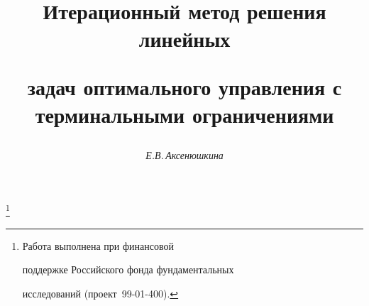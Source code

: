 




% 


\newcommand{\argmin}{\operatornamewithlimits{arg\,min}}


\newcommand{\tts}[1]{}







\setcounter{page}{3}















\author{\it Е.В.\,Аксенюшкина}




\title{Итерационный метод решения линейных 


задач оптимального управления с терминальными ограничениями}


\thanks{Работа выполнена при финансовой


поддержке Российского фонда фундаментальных


исследований (проект \No\,99-01-400).}





\date{}




\pagestyle{plain} %







\maketitle


